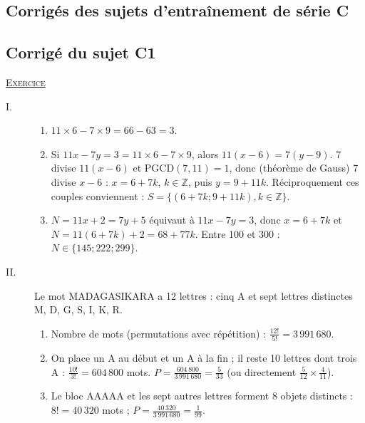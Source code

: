 \begin{corrige}
\newpage
\section{Corrig\'es des sujets d'entra\^inement de s\'erie C}
\subsection{Corrig\'e du sujet C1}
\noindent \underline{\textsc{Exercice}}
\begin{description}
\item[I.] \begin{enumerate}
      \item $11 \times 6 - 7 \times 9 = 66 - 63 = 3$.
      \item Si $11x - 7y = 3 = 11 \times 6 - 7 \times 9$, alors $11(x - 6) = 7(y - 9)$. 7 divise $11(x - 6)$ et
            $\mathrm{PGCD}(7 , 11) = 1$, donc (th\'eor\`eme de Gauss) 7 divise $x - 6$ : $x = 6 + 7k$, $k \in \mathbb{Z}$, puis $y = 9 + 11k$.
            R\'eciproquement ces couples conviennent : $S = \{(6 + 7k ; 9 + 11k), k \in \mathbb{Z}\}$.
      \item $N = 11x + 2 = 7y + 5$ \'equivaut \`a $11x - 7y = 3$, donc $x = 6 + 7k$ et $N = 11(6 + 7k) + 2 = 68 + 77k$.
            Entre 100 et 300 : $N \in \{145 ; 222 ; 299\}$.
      \end{enumerate}
\item[II.] Le mot MADAGASIKARA a 12 lettres : cinq A et sept lettres distinctes M, D, G, S, I, K, R.
      \begin{enumerate}
      \item Nombre de mots (permutations avec r\'ep\'etition) : $\frac{12!}{5!} = 3\,991\,680$.
      \item On place un A au d\'ebut et un A \`a la fin ; il reste 10 lettres dont trois A : $\frac{10!}{3!} = 604\,800$ mots.
            $P = \frac{604\,800}{3\,991\,680} = \frac{5}{33}$ (ou directement $\frac{5}{12} \times \frac{4}{11}$).
      \item Le bloc AAAAA et les sept autres lettres forment 8 objets distincts : $8! = 40\,320$ mots ; $P = \frac{40\,320}{3\,991\,680} = \frac{1}{99}$.
      \end{enumerate}
\end{description}


\end{corrige}
